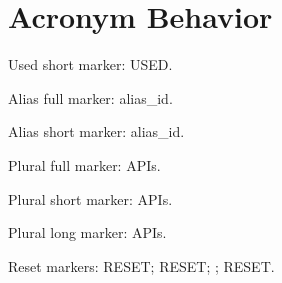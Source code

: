 \documentclass[a4paper,12pt]{report}
\begin{document}
\chapter{Acronym Behavior}
Used short marker: \acs{USED}.

Alias full marker: \acf{alias_id}.

Alias short marker: \acs{alias_id}.

Plural full marker: \acfp{API}.

Plural short marker: \acsp{API}.

Plural long marker: \aclp{API}.

Reset markers: \ac{RESET}; \ac{RESET}; ; \ac{RESET}.
\acronymsChapter
\end{document}

